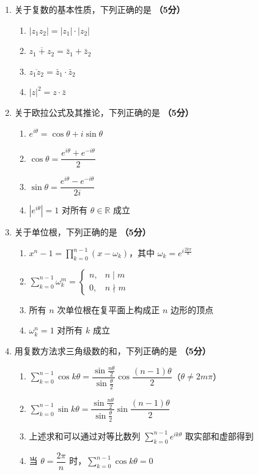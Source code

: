 \documentclass[12pt, a4paper]{ctexart}
\newcommand{\score}[1]{\hfill\textbf{（#1分）}}
\begin{document}
\vspace{8pt}

\begin{enumerate}[resume]

\item 关于复数的基本性质，下列正确的是 \score{5}
\begin{enumerate}[label=\Alph*.]
    \item $|z_1z_2|=|z_1|\cdot|z_2|$
    \item $\overline{z_1+z_2}=\bar{z}_1+\bar{z}_2$
    \item $\overline{z_1z_2}=\bar{z}_1\cdot\bar{z}_2$
    \item $|z|^2=z\cdot\bar{z}$
\end{enumerate}

\item 关于欧拉公式及其推论，下列正确的是 \score{5}
\begin{enumerate}[label=\Alph*.]
    \item $e^{i\theta}=\cos\theta+i\sin\theta$
    \item $\cos\theta=\dfrac{e^{i\theta}+e^{-i\theta}}{2}$
    \item $\sin\theta=\dfrac{e^{i\theta}-e^{-i\theta}}{2i}$
    \item $|e^{i\theta}|=1$ 对所有 $\theta\in\mathbb{R}$ 成立
\end{enumerate}

\item 关于单位根，下列正确的是 \score{5}
\begin{enumerate}[label=\Alph*.]
    \item $x^n-1=\displaystyle\prod_{k=0}^{n-1}(x-\omega_k)$，其中 $\omega_k=e^{i\frac{2k\pi}{n}}$
    \item $\displaystyle\sum_{k=0}^{n-1}\omega_k^m=\begin{cases}n,&n\mid m\\0,&n\nmid m\end{cases}$
    \item 所有 $n$ 次单位根在复平面上构成正 $n$ 边形的顶点
    \item $\omega_k^n=1$ 对所有 $k$ 成立
\end{enumerate}

\item 用复数方法求三角级数的和，下列正确的是 \score{5}
\begin{enumerate}[label=\Alph*.]
    \item $\displaystyle\sum_{k=0}^{n-1}\cos k\theta=\dfrac{\sin\frac{n\theta}{2}}{\sin\frac{\theta}{2}}\cos\dfrac{(n-1)\theta}{2}$（$\theta\neq 2m\pi$）
    \item $\displaystyle\sum_{k=0}^{n-1}\sin k\theta=\dfrac{\sin\frac{n\theta}{2}}{\sin\frac{\theta}{2}}\sin\dfrac{(n-1)\theta}{2}$
    \item 上述求和可以通过对等比数列 $\displaystyle\sum_{k=0}^{n-1}e^{ik\theta}$ 取实部和虚部得到
    \item 当 $\theta=\dfrac{2\pi}{n}$ 时，$\displaystyle\sum_{k=0}^{n-1}\cos k\theta=0$
\end{enumerate}

\end{enumerate}
\end{document}
